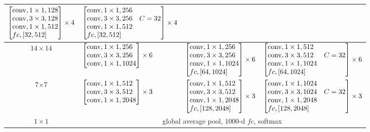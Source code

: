 \begin{table}[t]
\begin{center}
{{\begin{tabular}{c|p{3.5cm}<{\centering}|p{4.9cm}<{\centering}|p{5.1cm}<{\centering}}
$\begin{bmatrix*}[l] {\rm conv}, 1\times 1, 128\\ {\rm conv}, 3\times 3, 128\\ {\rm conv}, 1\times 1, 512\\ fc, [32, 512] \end{bmatrix*} \times 4$ & 
$\begin{bmatrix*}[l] {\rm conv}, 1\times 1, 256 &\\ {\rm conv}, 3\times 3, 256 & C=32\\ {\rm conv}, 1\times 1, 512\\ fc, [32,512] \end{bmatrix*} \times 4$ \\
\hline
$14\times14$ &
$\begin{bmatrix*}[l] {\rm conv}, 1\times 1, 256\\ {\rm conv}, 3\times 3, 256\\ {\rm conv}, 1\times 1, 1024 \end{bmatrix*} \times 6$ &
$\begin{bmatrix*}[l] {\rm conv}, 1\times 1, 256\\ {\rm conv}, 3\times 3, 256\\ {\rm conv}, 1\times 1, 1024\\ fc, [64, 1024] \end{bmatrix*} \times 6$ & 
$\begin{bmatrix*}[l] {\rm conv}, 1\times 1, 512 &\\ {\rm conv}, 3\times 3, 512 & C=32\\ {\rm conv}, 1\times 1, 1024\\ fc, [64, 1024] \end{bmatrix*} \times 6$ \\
\hline
7$\times$7 &
$\begin{bmatrix*}[l] {\rm conv}, 1\times 1, 512\\ {\rm conv}, 3\times 3, 512\\ {\rm conv}, 1\times1, 2048\end{bmatrix*} \times 3$ &
$\begin{bmatrix*}[l] {\rm conv}, 1\times 1, 512\\ {\rm conv}, 3\times 3, 512\\ {\rm conv}, 1\times1, 2048\\ fc, [128, 2048] \end{bmatrix*} \times 3$ & 
$\begin{bmatrix*}[l] {\rm conv}, 1\times 1, 1024 &\\ {\rm conv}, 3\times 3, 1024 & C=32\\ {\rm conv}, 1\times 1, 2048\\ fc, [128, 2048] \end{bmatrix*} \times 3$\\
\hline
$1\times1$ & \multicolumn{3}{c}{global average pool, $1000$-d $fc$, softmax} \\
\hline
\end{tabular}}}
\end{center}
\end{table}
